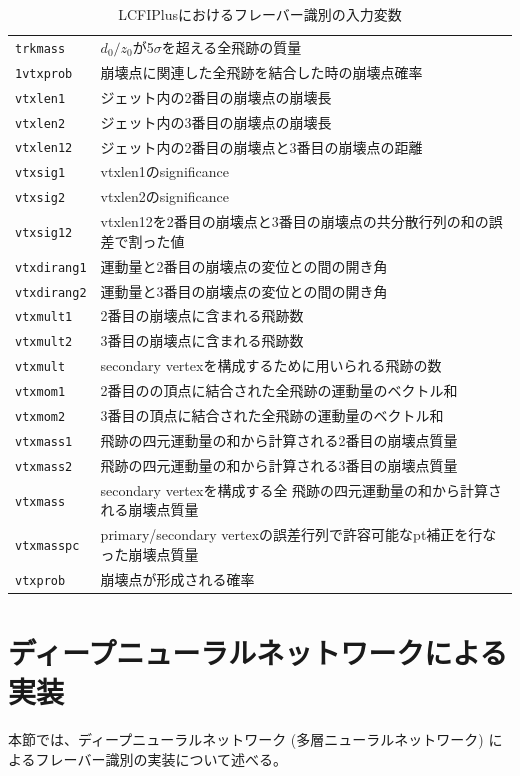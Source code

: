 \begin{table}[H]
\begin{tabular}{ l | l }
   \texttt{trkmass} & $d_0/z_0$が5$\sigma$を超える全飛跡の質量\\
   \texttt{1vtxprob} & 崩壊点に関連した全飛跡を結合した時の崩壊点確率\\
   \texttt{vtxlen1} & ジェット内の2番目の崩壊点の崩壊長\\
   \texttt{vtxlen2} & ジェット内の3番目の崩壊点の崩壊長\\
   \texttt{vtxlen12} & ジェット内の2番目の崩壊点と3番目の崩壊点の距離\\
   \texttt{vtxsig1} & vtxlen1のsignificance\\
   \texttt{vtxsig2} & vtxlen2のsignificance\\
   \texttt{vtxsig12} & vtxlen12を2番目の崩壊点と3番目の崩壊点の共分散行列の和の誤差で割った値\\
   \texttt{vtxdirang1} & 運動量と2番目の崩壊点の変位との間の開き角\\
   \texttt{vtxdirang2} & 運動量と3番目の崩壊点の変位との間の開き角\\
   \texttt{vtxmult1} & 2番目の崩壊点に含まれる飛跡数\\
   \texttt{vtxmult2} & 3番目の崩壊点に含まれる飛跡数\\
   \texttt{vtxmult} & secondary vertexを構成するために用いられる飛跡の数\\
   \texttt{vtxmom1} & 2番目のの頂点に結合された全飛跡の運動量のベクトル和\\
   \texttt{vtxmom2} & 3番目の頂点に結合された全飛跡の運動量のベクトル和\\
   \texttt{vtxmass1} & 飛跡の四元運動量の和から計算される2番目の崩壊点質量\\
   \texttt{vtxmass2} & 飛跡の四元運動量の和から計算される3番目の崩壊点質量\\
   \texttt{vtxmass} & secondary vertexを構成する全 飛跡の四元運動量の和から計算される崩壊点質量\\
   \texttt{vtxmasspc} & primary/secondary vertexの誤差行列で許容可能なpt補正を行なった崩壊点質量\\
   \texttt{vtxprob} & 崩壊点が形成される確率\\
   \hline
  \end{tabular}
  \caption{LCFIPlusにおけるフレーバー識別の入力変数}
 \label{lcfiplusin}
\end{table}
\section{ディープニューラルネットワークによる実装}
本節では、ディープニューラルネットワーク (多層ニューラルネットワーク) によるフレーバー識別の実装について述べる。
